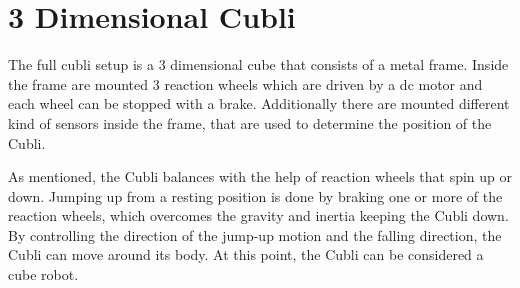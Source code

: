 \section{3 Dimensional Cubli}
The full cubli setup is a 3 dimensional cube that consists of a metal frame. Inside the frame are mounted 3 reaction wheels which are driven by a dc motor and each wheel can be stopped with a brake. 
Additionally there are mounted different kind of sensors inside the frame, that are used to determine the position of the Cubli.


As mentioned, the Cubli balances with the help of reaction wheels that spin up or down. Jumping up from a resting position is done by braking one or more of the reaction wheels, which overcomes the gravity and inertia keeping the Cubli down.
By controlling the direction of the jump-up motion and the falling direction, the Cubli can move around its body. At this point, the Cubli can be considered a cube robot.\\
